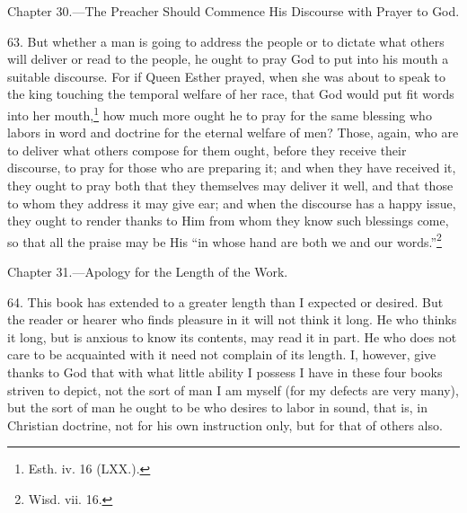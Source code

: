 
Chapter 30.—The Preacher Should Commence His Discourse with Prayer to God.

63. But whether a man is going to address the people or to dictate what others will deliver or read to the people, he ought to pray God to put into his mouth a suitable discourse. For if Queen Esther prayed, when she was about to speak to the king touching the temporal welfare of her race, that God would put fit words into her mouth,\footnote{Esth. iv. 16 (LXX.).} how much more ought he to pray for the same blessing who labors in word and doctrine for the eternal welfare of men? Those, again, who are to deliver what others compose for them ought, before they receive their discourse, to pray for those who are preparing it; and when they have received it, they ought to pray both that they themselves may deliver it well, and that those to whom they address it may give ear; and when the discourse has a happy issue, they ought to render thanks to Him from whom they know such blessings come, so that all the praise may be His “in whose hand are both we and our words.”\footnote{Wisd. vii. 16.}


Chapter 31.—Apology for the Length of the Work.

64. This book has extended to a greater length than I expected or desired. But the reader or hearer who finds pleasure in it will not think it long. He who thinks it long, but is anxious to know its contents, may read it in part. He who does not care to be acquainted with it need not complain of its length. I, however, give thanks to God that with what little ability I possess I have in these four books striven to depict, not the sort of man I am myself (for my defects are very many), but the sort of man he ought to be who desires to labor in sound, that is, in Christian doctrine, not for his own instruction only, but for that of others also.

